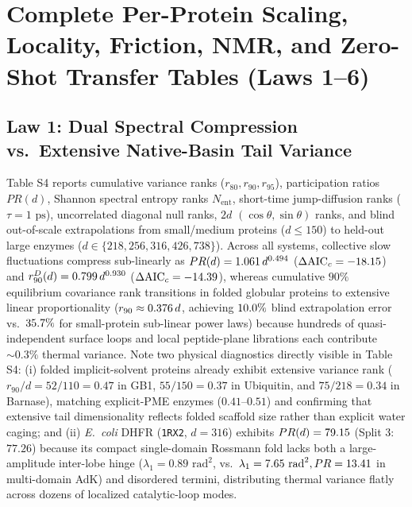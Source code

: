 \documentclass[10pt,letterpaper]{article}
\begin{document}
\clearpage
\section{Complete Per-Protein Scaling, Locality, Friction, NMR, and Zero-Shot Transfer Tables (Laws 1--6)}

\subsection{Law 1: Dual Spectral Compression vs.\ Extensive Native-Basin Tail Variance}
Table S4 reports cumulative variance ranks ($r_{80}, r_{90}, r_{95}$), participation ratios $PR(d)$, Shannon spectral entropy ranks $N_{\mathrm{ent}}$, short-time jump-diffusion ranks ($\tau = 1\text{ ps}$), uncorrelated diagonal null ranks, $2d$ $(\cos\theta,\sin\theta)$ ranks, and blind out-of-scale extrapolations from small/medium proteins ($d \le 150$) to held-out large enzymes ($d \in \{218, 256, 316, 426, 738\}$). Across all \vFourTotalSystems{} systems, collective slow fluctuations compress sub-linearly as $PR(d) = 1.061{}\,d^{0.494{}}$ ($\Delta\mathrm{AIC}_c = -18.15{}$) and $r_{90}^D(d) = 0.799{}\,d^{0.930{}}$ ($\Delta\mathrm{AIC}_c = -14.39{}$), whereas cumulative $90\%$ equilibrium covariance rank transitions in folded globular proteins to extensive linear proportionality ($r_{90} \approx 0.376{}\,d$, achieving $10.0{}\%$ blind extrapolation error vs.\ $35.7{}\%$ for small-protein sub-linear power laws) because hundreds of quasi-independent surface loops and local peptide-plane librations each contribute $\sim 0.3\%$ thermal variance. Note two physical diagnostics directly visible in Table S4: (i) folded implicit-solvent proteins already exhibit extensive variance rank ($r_{90}/d = 52/110 = 0.47$ in GB1, $55/150 = 0.37$ in Ubiquitin, and $75/218 = 0.34$ in Barnase), matching explicit-PME enzymes ($0.41\text{--}0.51$) and confirming that extensive tail dimensionality reflects folded scaffold size rather than explicit water caging; and (ii) \textit{E.\ coli} DHFR (\texttt{1RX2}, $d=316$) exhibits $PR(d) = 79.15{}$ (Split 3: $77.26$) because its compact single-domain Rossmann fold lacks both a large-amplitude inter-lobe hinge ($\lambda_1 = 0.89\text{ rad}^2$, vs.\ $\lambda_1 = 7.65\text{ rad}^2, PR = 13.41{}$ in multi-domain AdK) and disordered termini, distributing thermal variance flatly across dozens of localized catalytic-loop modes.
\end{document}
